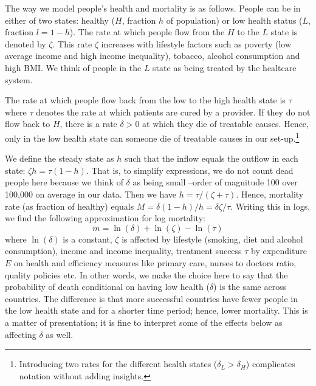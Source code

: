 \documentclass[a4paper,12pt]{article}
\begin{document}
The way we model people's health and mortality is as follows. People can be in either of two states: healthy (\(H\), fraction \(h\) of population) or low health status (\(L\), fraction \(l=1-h\)). The rate at which people flow from the \(H\) to the \(L\) state is denoted by \(\zeta\). This rate \(\zeta\) increases with lifestyle factors such as poverty (low average income and high income inequality), tobacco, alcohol consumption and high BMI. We think of people in the \(L\) state as being treated by the healtcare system.

The rate at which people flow back from the low to the high health state is \(\tau\) where \(\tau\) denotes the rate at which patients are cured by a provider. If they do not flow back to \(H\), there is a rate \(\delta > 0\) at which they die of treatable causes. Hence, only in the low health state can someone die of treatable causes in our set-up.\footnote{Introducing two rates for the different health states (\(\delta_L > \delta_H\)) complicates notation without adding insights.}

We define the steady state as \(h\) such that the inflow equals the outflow in each state: \(\zeta h = \tau (1-h)\). That is, to simplify expressions, we do not count dead people here because we think of \(\delta\) as being small --order of magnitude 100 over 100,000 on average in our data. Then we have \(h =\tau/(\zeta+\tau)\). Hence, mortality rate (as fraction of healthy) equals \(M = \delta (1-h)/h = \delta \zeta/\tau\). Writing this in logs, we find the following approximation for log mortality:
\begin{equation}
\label{eq:1}
m = \ln(\delta) + \ln(\zeta) - \ln(\tau)
\end{equation}
where \(\ln(\delta)\) is a constant, \(\zeta\) is affected by lifestyle (smoking, diet and alcohol consumption), income and income inequality, treatment success \(\tau\) by expenditure \(E\) on health and efficiency measures like primary care, nurses to doctors ratio, quality policies etc. In other words, we make the choice here to say that the probability of death conditional on having low health (\(\delta\)) is the same across countries. The difference is that more successful countries have fewer people in the low health state and for a shorter time period; hence, lower mortality. This is a matter of presentation; it is fine to interpret some of the effects below as affecting \(\delta\) as well.
\end{document}
